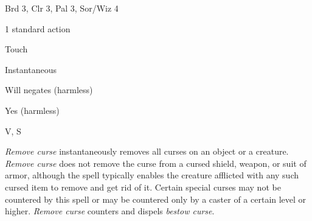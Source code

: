
\begin{description*}
\item[Level:] Brd 3, Clr 3, Pal 3, Sor/Wiz 4
\item[Casting Time:] 1 standard action
\item[Range:] Touch
\item[Duration:] Instantaneous
\item[Saving Throw:] Will negates (harmless)
\item[Spell Resistance:] Yes (harmless)
\item[Components:] V, S
\end{description*}

\textit{Remove curse} instantaneously removes all curses on an object or a creature.
\textit{Remove curse} does not remove the curse from a cursed shield, weapon, or
suit of armor, although the spell typically enables the creature afflicted with
any such cursed item to remove and get rid of it. Certain special curses may not
be countered by this spell or may be countered only by a caster of a certain level
or higher.
\textit{Remove curse} counters and dispels \textit{bestow curse}.